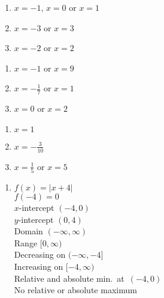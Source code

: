 {\begin{multicols}{3}
\begin{enumerate}
\setcounter{enumi}{\value{HW}}

\item  $x=-1$, $x= 0$ or $x= 1$

\item $x=-3$ or $x=3$

\item $x=-2$ or $x=2$

\setcounter{HW}{\value{enumi}}
\end{enumerate}
\end{multicols}

\begin{multicols}{3} 
\begin{enumerate}
\setcounter{enumi}{\value{HW}}

\item $x = -1$ or $x = 9$

\item $x = -\frac{1}{7}$ or $x = 1$

\item $x = 0$ or $x = 2$

\setcounter{HW}{\value{enumi}}
\end{enumerate}
\end{multicols}

\begin{multicols}{3} 
\begin{enumerate}
\setcounter{enumi}{\value{HW}}

\item $x=1$

\item $x = -\frac{3}{10}$

\item $x = \frac{1}{5}$ or $x = 5$

\setcounter{HW}{\value{enumi}}
\end{enumerate}
\end{multicols}


\begin{enumerate}
\setcounter{enumi}{\value{HW}}

\item \begin{multicols}{2} \raggedcolumns

$f(x) = |x + 4|$ \\ $f(-4) = 0$ \\ $x$-intercept $(-4, 0)$ \\ $y$-intercept $(0, 4)$ \\ Domain $(-\infty, \infty)$ \\ Range $[0, \infty)$ \\ Decreasing on $(-\infty, -4]$ \\ Increasing on $[-4, \infty)$ \\ Relative and absolute min.~at~$(-4,0)$ \\ No relative or absolute maximum



\end{multicols}
\end{enumerate}}
